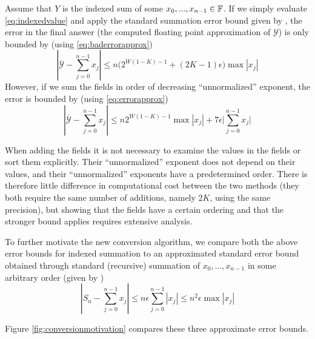     Assume that $Y$ is the indexed sum of some $x_0, ..., x_{n - 1} \in \mathbb{F}$. If we simply evaluate \eqref{eq:indexedvalue} and apply the standard summation error bound given by \cite{higham}, the error in the final answer (the computed floating point approximation of $\mathcal{Y}$) is only bounded by (using  \eqref{eq:baderrorapprox})
    \begin{equation}
      |\overline{\mathcal{Y}} - \sum_{j=0}^{n-1}x_j| \leq n \bigl(2^{W  (1 - K) - 1} + (2  K - 1)  \epsilon\bigr)\max|x_j|
      \label{eq:baderrorapproxdup}
    \end{equation}
    However, if we sum the fields in order of decreasing ``unnormalized'' exponent, the error is bounded by (using  \eqref{eq:errorapprox})
    \begin{equation}
      |\overline{\mathcal{Y}} - \sum_{j=0}^{n-1}x_j| \leq n 2^{W  (1 - K) - 1}\max|x_j|  + 7 \epsilon \bigl|\sum\limits_{j = 0}^{n - 1} x_j\bigr|
      \label{eq:errorapproxdup}
    \end{equation}

    When adding the fields it is not necessary to examine the values in the fields or sort them explicitly. Their ``unnormalized'' exponent does not depend on their values, and their ``unnormalized'' exponents have a predetermined order. There is therefore little difference in computational cost between the two methods (they both require the same number of additions, namely $2  K$, using the same precision), but showing that the fields have a certain ordering and that the stronger bound applies requires extensive analysis.

    To further motivate the new conversion algorithm, we compare both the above error bounds for indexed summation to an approximated standard error bound obtained through standard (recursive) summation of $x_0, ..., x_{n - 1}$ in some arbitrary order (given by \cite{higham})
    \begin{equation}
      |S_n - \sum_{j=0}^{n-1}x_j| \leq n \epsilon  \sum\limits_{j = 0}^{n - 1}|x_j| \leq n^2  \epsilon  \max|x_j|
      \label{eq:naiveerrorapproxdup}
    \end{equation}

    Figure \ref{fig:conversionmotivation} compares these three approximate error bounds.

